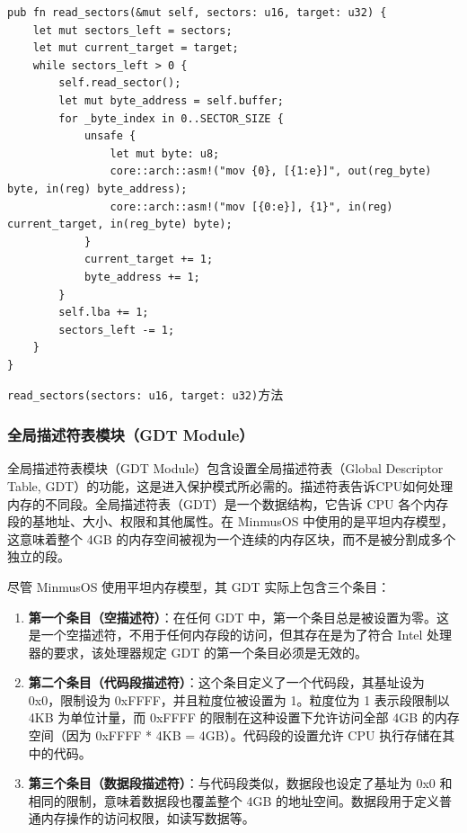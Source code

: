\begin{listing}[htbp]
    \begin{verbatim}
pub fn read_sectors(&mut self, sectors: u16, target: u32) {
    let mut sectors_left = sectors;
    let mut current_target = target;
    while sectors_left > 0 {
        self.read_sector();
        let mut byte_address = self.buffer;
        for _byte_index in 0..SECTOR_SIZE {
            unsafe {
                let mut byte: u8;
                core::arch::asm!("mov {0}, [{1:e}]", out(reg_byte) byte, in(reg) byte_address);
                core::arch::asm!("mov [{0:e}], {1}", in(reg) current_target, in(reg_byte) byte);
            }
            current_target += 1;
            byte_address += 1;
        }
        self.lba += 1;
        sectors_left -= 1;
    }
}
    \end{verbatim}
    \caption{\texttt{read\_sectors(sectors: u16, target: u32)}方法}\label{lst:ReadSectorsBootloaderMethod}
\end{listing}

\subsubsection{全局描述符表模块（GDT Module）}

全局描述符表模块（GDT Module）包含设置全局描述符表（Global Descriptor Table, GDT）的功能，这是进入保护模式所必需的。描述符表告诉CPU如何处理内存的不同段。全局描述符表（GDT）是一个数据结构，它告诉 CPU 各个内存段的基地址、大小、权限和其他属性。在 MinmusOS 中使用的是平坦内存模型，这意味着整个 4GB 的内存空间被视为一个连续的内存区块，而不是被分割成多个独立的段。

尽管 MinmusOS 使用平坦内存模型，其 GDT 实际上包含三个条目：

\begin{enumerate}
    \item \textbf{第一个条目（空描述符）}：在任何 GDT 中，第一个条目总是被设置为零。这是一个空描述符，不用于任何内存段的访问，但其存在是为了符合 Intel 处理器的要求，该处理器规定 GDT 的第一个条目必须是无效的。
    \item \textbf{第二个条目（代码段描述符）}：这个条目定义了一个代码段，其基址设为 0x0，限制设为 0xFFFF，并且粒度位被设置为 1。粒度位为 1 表示段限制以 4KB 为单位计量，而 0xFFFF 的限制在这种设置下允许访问全部 4GB 的内存空间（因为 0xFFFF * 4KB = 4GB）。代码段的设置允许 CPU 执行存储在其中的代码。
    \item \textbf{第三个条目（数据段描述符）}：与代码段类似，数据段也设定了基址为 0x0 和相同的限制，意味着数据段也覆盖整个 4GB 的地址空间。数据段用于定义普通内存操作的访问权限，如读写数据等。
\end{enumerate}

